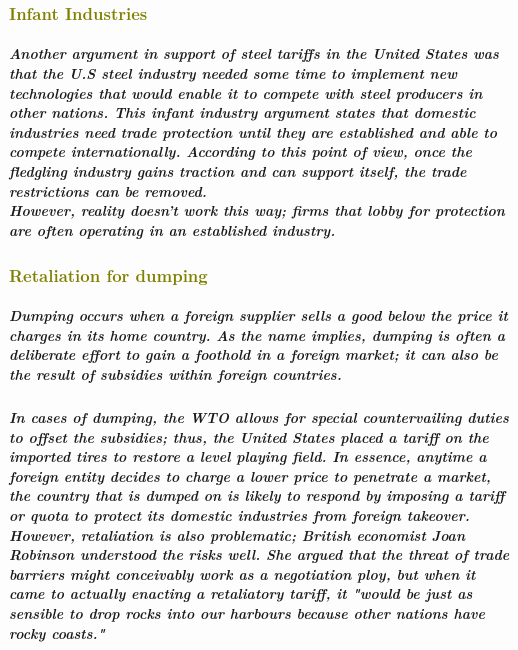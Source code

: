 \documentclass[11pt]{article} %
\begin{document}
\subsubsection*{\textcolor{olive}{Infant Industries}}
\subparagraph*{Another argument in support of steel tariffs in the United States was that the U.S steel industry needed some time to implement new technologies that would enable it to compete with steel producers in other nations. This \textbf{infant industry argument} states that domestic industries need trade protection until they are established and able to compete internationally. According to this point of view, once the fledgling industry gains traction and can support itself, the trade restrictions can be removed. \\However, reality doesn't work this way; firms that lobby for protection are often operating in an established industry.}
\subsubsection*{\textcolor{olive}{Retaliation for dumping}}
\subparagraph*{\textbf{Dumping} occurs when a foreign supplier sells a good below the price it charges in its home country. As the name implies, dumping is often a deliberate effort to gain a foothold in a foreign market; it can also be the result of subsidies within foreign countries.}
\subparagraph*{In cases of dumping, the WTO allows for special \textit{countervailing duties} to offset the subsidies; thus, the United States placed a tariff on the imported tires to restore a level playing field. In essence, anytime a foreign entity decides to charge a lower price to penetrate a market, the country that is dumped on is likely to respond by imposing a tariff or quota to protect its domestic industries from foreign takeover. However, retaliation is also problematic; British economist Joan Robinson understood the risks well. She argued that the threat of trade barriers might conceivably work as a negotiation ploy, but when it came to actually enacting a retaliatory tariff, it "would be just as sensible to drop rocks into our harbours because other nations have rocky coasts."}
\end{document}
